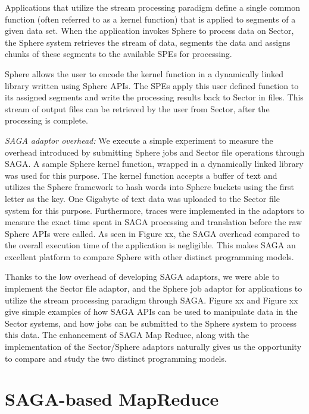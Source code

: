 \documentclass[3p,twocolumn]{elsarticle}
\begin{document}
Applications that utilize the stream processing paradigm define a
single common function (often referred to as a kernel function) that
is applied to segments of a given data set. When the application
invokes Sphere to process data on Sector, the Sphere system retrieves
the stream of data, segments the data and assigns chunks of these
segments to the available SPEs for processing.

Sphere allows the user to encode the kernel function in a dynamically
linked library written using Sphere APIs. The SPEs apply this user
defined function to its assigned segments and write the processing
results back to Sector in files. This stream of output files can be
retrieved by the user from Sector, after the processing is
complete. 


{\it SAGA adaptor overhead: } We execute a simple experiment to
measure the overhead introduced by submitting Sphere jobs and Sector
file operations through SAGA. A sample Sphere kernel function, wrapped
in a dynamically linked library was used for this purpose. The kernel
function accepts a buffer of text and utilizes the Sphere framework to
hash words into Sphere buckets using the first letter as the key. One
Gigabyte of text data was uploaded to the Sector file system for this
purpose.  Furthermore, traces were implemented in the adaptors to
measure the exact time spent in SAGA processing and translation before
the raw Sphere APIs were called.  As seen in Figure xx, the SAGA
overhead compared to the overall execution time of the application is
negligible. This makes SAGA an excellent platform to compare Sphere
with other distinct programming models.

Thanks to the low overhead of developing SAGA adaptors, we were able
to implement the Sector file adaptor, and the Sphere job adaptor for
applications to utilize the stream processing paradigm through
SAGA. Figure xx and Figure xx give simple examples of how SAGA APIs
can be used to manipulate data in the Sector systems, and how jobs can
be submitted to the Sphere system to process this data.  The
enhancement of SAGA Map Reduce, along with the implementation of the
Sector/Sphere adaptors naturally gives us the opportunity to compare
and study the two distinct programming models.



\section{SAGA-based MapReduce}
\end{document}
